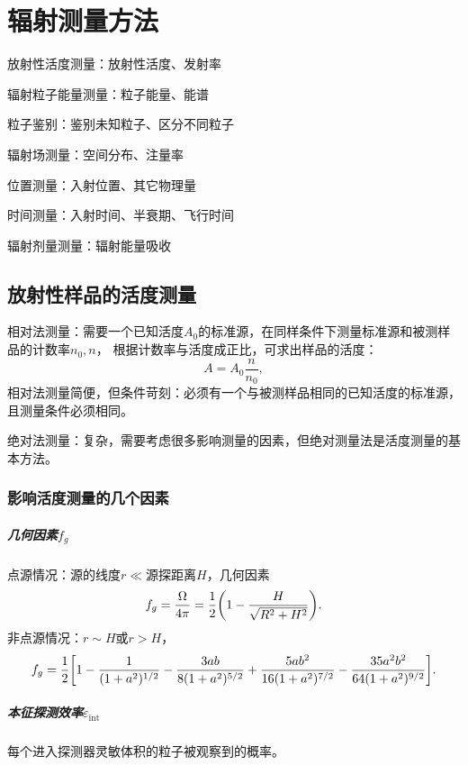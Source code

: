 \chapter{辐射测量方法}
\begin{compactitem}
	\item 放射性活度测量：放射性活度、发射率
	\item 辐射粒子能量测量：粒子能量、能谱
	\item 粒子鉴别：鉴别未知粒子、区分不同粒子
	\item 辐射场测量：空间分布、注量率
	\begin{compactitem}
		\item 位置测量：入射位置、其它物理量
		\item 时间测量：入射时间、半衰期、飞行时间
		\item 辐射剂量测量：辐射能量吸收
	\end{compactitem}
\end{compactitem}

\section{放射性样品的活度测量}

相对法测量：需要一个已知活度$A_0$的标准源，在同样条件下测量标准源和被测样品的计数率$n_0,n$， 根据计数率与活度成正比，可求出样品的活度：
\[
	A=A_0\frac n{n_0},
\]
相对法测量简便，但条件苛刻：必须有一个与被测样品相同的已知活度的标准源，且测量条件必须相同。

绝对法测量：复杂，需要考虑很多影响测量的因素，但绝对测量法是活度测量的基本方法。

\subsection{影响活度测量的几个因素}

\paragraph{几何因素$f_g$}
点源情况：源的线度$r\ll$源探距离$H$，几何因素
\[
	f_g=\frac\Omega{4\pi}=\frac12\biggl(1-\frac H{\sqrt{R^2+H^2}}\biggr).
\]
非点源情况：$r\sim H$或$r>H$，
\[
	f_g=\frac12\biggl[1-\frac1{(1+a^2)^{1/2}}-\frac{3ab}{8(1+a^2)^{5/2}}+\frac{5ab^2}{16(1+a^2)^{7/2}}-\frac{35a^2b^2}{64(1+a^2)^{9/2}}\biggr].
\]
\paragraph{本征探测效率$\varepsilon_{\mathrm{int}}$}
每个进入探测器灵敏体积的粒子被观察到的概率。

